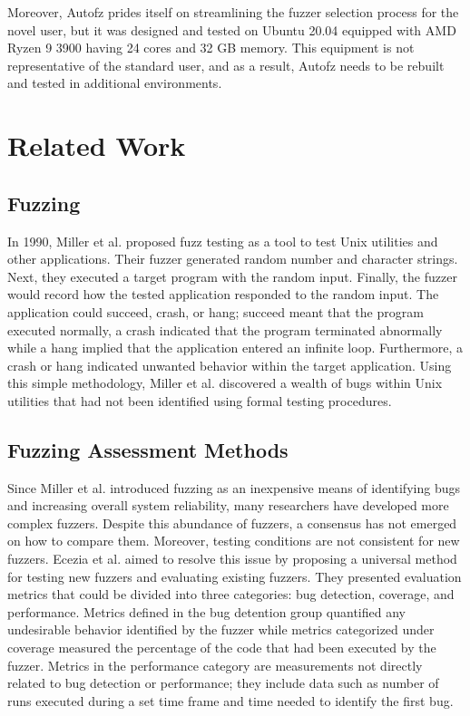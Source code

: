 Moreover, Autofz prides itself on streamlining the fuzzer selection process for 
the novel user, but it was designed and tested on Ubuntu 20.04 equipped with AMD 
Ryzen 9 3900 having 24 cores and 32 GB memory. This equipment is not representative 
of the standard user, and as a result, Autofz needs to be rebuilt and tested in 
additional environments. \cite{Fu}

\section{Related Work}

\subsection{Fuzzing}
In 1990, Miller et al. proposed fuzz testing as a tool to test Unix utilities 
and other applications. Their fuzzer generated random number and character 
strings. Next, they executed a target program with the random input. Finally, 
the fuzzer would record how the tested application responded to the random input. 
The application could succeed, crash, or hang; succeed meant that the program 
executed normally, a crash indicated that the program terminated abnormally while 
a hang implied that the application entered an infinite loop. Furthermore, a 
crash or hang indicated unwanted behavior within the target application. Using this 
simple methodology, Miller et al. discovered a wealth of bugs within Unix utilities 
that had not been identified using formal testing procedures. \cite{Miller}

\subsection{Fuzzing Assessment Methods}
Since Miller et al. introduced fuzzing as an inexpensive means of identifying bugs 
and increasing overall system reliability, many researchers have developed more 
complex fuzzers. Despite this abundance of fuzzers, a consensus has not emerged 
on how to compare them. Moreover, testing conditions are not consistent for new fuzzers. 
Ecezia et al. aimed to resolve this issue by proposing a universal method for testing new 
fuzzers and evaluating existing fuzzers. They presented evaluation metrics that could be 
divided into three categories: bug detection, coverage, and performance. Metrics defined 
in the bug detention group quantified any undesirable behavior identified by the fuzzer 
while metrics categorized under coverage measured the percentage of the code that had 
been executed by the fuzzer. Metrics in the performance category are measurements not 
directly related to bug detection or performance; they include data such as number of 
runs executed during a set time frame and time needed to identify the first bug.

